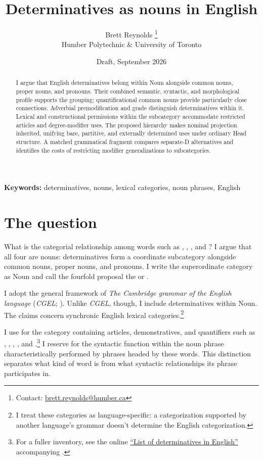 \documentclass[12pt]{article}
\title{Determinatives as nouns in English}
\author{Brett Reynolds \orcidlink{0000-0003-0073-7195}%
\thanks{Contact: \href{mailto:brett.reynolds@humber.ca}{brett.reynolds@humber.ca}}\\
Humber Polytechnic \& University of Toronto}
\date{Draft, September 2026}
\begin{document}
\maketitle

\begin{abstract}
I argue that English determinatives belong within Noun alongside common nouns, proper nouns, and pronouns. Their combined semantic, syntactic, and morphological profile supports the grouping; quantificational common nouns provide particularly close connections. Adverbial premodification and grade distinguish determinatives within it. Lexical and constructional permissions within the subcategory accommodate restricted articles and degree-modifier uses. The proposed hierarchy makes nominal projection inherited, unifying bare, partitive, and externally determined uses under ordinary Head structure. A matched grammatical fragment compares separate-D alternatives and identifies the costs of restricting modifier generalizations to subcategories.
\end{abstract}

\noindent\textbf{Keywords:} determinatives, nouns, lexical categories, noun phrases, English

\section{The question}\label{sec:intro}

What is the categorial relationship among words such as , , , and ? I argue that all four are nouns: determinatives form a coordinate subcategory alongside common nouns, proper nouns, and pronouns. I write the superordinate category as Noun and call the fourfold proposal the  or .

I adopt the general framework of \textit{The Cambridge grammar of the English language} (\textit{CGEL}; \citealt{huddleston2002}). Unlike \textit{CGEL}, though, I include determinatives within Noun. The claims concern synchronic English lexical categories.\footnote{I treat these categories as language-specific: a categorization supported by another language's grammar doesn't determine the English categorization.}

I use  for the category containing articles, demonstratives, and quantifiers such as , , , , and .\footnote{For a fuller inventory, see the online \href{https://www.cambridge.org/highereducation/api/resources/2AC8DF5CA558F8A6FCDFACD0EAF8EA08}{\enquote{List of determinatives in English}} accompanying \textcite{Huddleston2021}.} I reserve  for the syntactic function within the noun phrase characteristically performed by phrases headed by these words. This distinction separates what kind of word  is from what syntactic relationships its phrase participates in.
\end{document}
